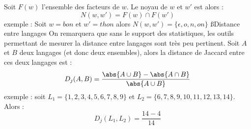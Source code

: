 \documentclass[a4paper,11pt]{article}
\begin{document}
  Soit $F(w)$ l'ensemble des facteurs de $w$. Le noyau de $w$ et $w'$ est
  alors :
  \[
  N(w, w') = F(w) \cap F(w')
  \]
  \p exemple : Soit $w = bon$ et $w' = thon$ alors
  $N(w, w') = \{\epsilon, o, n, on\}$
 \ss{Distance entre langages}
 On remarquera que sans le support des statistiques, les outils
 permettant de mesurer la distance entre langages sont très peu
 pertinent.
  Soit $A$ et $B$ deux langages (et donc deux ensembles), alors la distance de
  Jaccard entre ces deux langages est :
  \[
  D_j(A, B) = \frac{\abs{A \cup B} - \abs{A \cap B}}{\abs{A \cup B}}
  \]
  \p exemple : soit $L_1 = \{1, 2, 3, 4, 5, 6, 7, 8, 9\}$ et
  $L_2 = \{6, 7, 8, 9, 10, 11, 12, 13, 14\}$. Alors :
  \[
  D_j(L_1, L_2) = \frac{14 - 4}{14}
  \]
\end{document}
